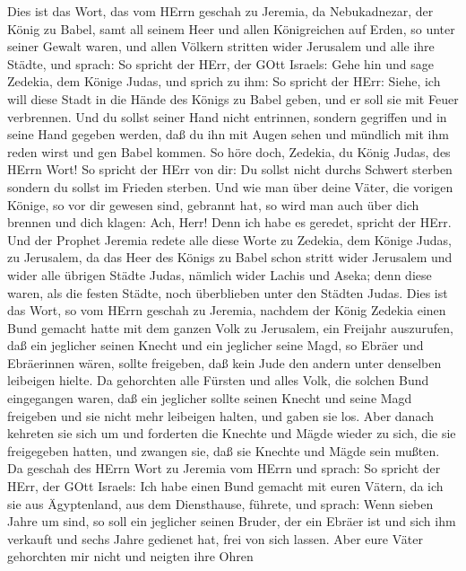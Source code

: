  Dies ist das Wort, das vom HErrn geschah zu Jeremia, da
Nebukadnezar, der König zu Babel, samt all seinem Heer und allen
Königreichen auf Erden, so unter seiner Gewalt waren, und allen Völkern
stritten wider Jerusalem und alle ihre Städte, und sprach: 
So spricht der HErr, der GOtt Israels: Gehe hin und sage Zedekia, dem
Könige Judas, und sprich zu ihm: So spricht der HErr: Siehe, ich will
diese Stadt in die Hände des Königs zu Babel geben, und er soll sie mit
Feuer verbrennen.  Und du sollst seiner Hand nicht
entrinnen, sondern gegriffen und in seine Hand gegeben werden, daß du
ihn mit Augen sehen und mündlich mit ihm reden wirst und gen Babel
kommen.  So höre doch, Zedekia, du König Judas, des HErrn
Wort! So spricht der HErr von dir: Du sollst nicht durchs Schwert
sterben  sondern du sollst im Frieden sterben. Und wie man
über deine Väter, die vorigen Könige, so vor dir gewesen sind, gebrannt
hat, so wird man auch über dich brennen und dich klagen: Ach, Herr! Denn
ich habe es geredet, spricht der HErr.  Und der Prophet
Jeremia redete alle diese Worte zu Zedekia, dem Könige Judas, zu
Jerusalem,  da das Heer des Königs zu Babel schon stritt
wider Jerusalem und wider alle übrigen Städte Judas, nämlich wider
Lachis und Aseka; denn diese waren, als die festen Städte, noch
überblieben unter den Städten Judas.  Dies ist das Wort, so
vom HErrn geschah zu Jeremia, nachdem der König Zedekia einen Bund
gemacht hatte mit dem ganzen Volk zu Jerusalem, ein Freijahr auszurufen,
 daß ein jeglicher seinen Knecht und ein jeglicher seine
Magd, so Ebräer und Ebräerinnen wären, sollte freigeben, daß kein Jude
den andern unter denselben leibeigen hielte.  Da gehorchten
alle Fürsten und alles Volk, die solchen Bund eingegangen waren, daß ein
jeglicher sollte seinen Knecht und seine Magd freigeben und sie nicht
mehr leibeigen halten, und gaben sie los.  Aber danach
kehreten sie sich um und forderten die Knechte und Mägde wieder zu sich,
die sie freigegeben hatten, und zwangen sie, daß sie Knechte und Mägde
sein mußten.  Da geschah des HErrn Wort zu Jeremia vom
HErrn und sprach:  So spricht der HErr, der GOtt Israels:
Ich habe einen Bund gemacht mit euren Vätern, da ich sie aus
Ägyptenland, aus dem Diensthause, führete, und sprach: 
Wenn sieben Jahre um sind, so soll ein jeglicher seinen Bruder, der ein
Ebräer ist und sich ihm verkauft und sechs Jahre gedienet hat, frei von
sich lassen. Aber eure Väter gehorchten mir nicht und neigten ihre Ohren
